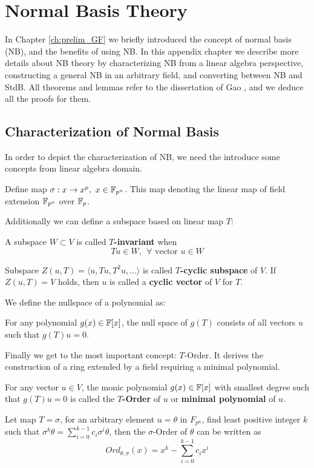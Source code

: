 \chapter{Normal Basis Theory}
\label{append:NB}
In Chapter \ref{ch:prelim_GF} we briefly introduced the concept of normal basis (NB), and 
the benefits of using NB. In this appendix chapter we describe more details about NB theory by 
characterizing NB from a linear algebra perspective, constructing a general NB in an 
arbitrary field, and converting between NB and StdB. All theorems and lemmas refer to the 
dissertation of Gao \cite{gao:phd_normal_basis}, and we deduce all the proofs for them.
\section{Characterization of Normal Basis}
In order to depict the characterization of NB, we need the introduce some concepts from linear algebra domain.
\begin{Definition}
Define map $\sigma:x\to x^p,~x\in {\mathbb{F}}_{p^n}$. This map denoting the linear map of field extension ${\mathbb{F}}_{p^n}$
over ${\mathbb{F}}_p$.
\end{Definition}
Additionally we can define a subspace based on linear map $T$:
\begin{Definition}
A subspace $W\subset V$ is called {\bf $T$-invariant} when 
$$Tu \in W, ~~ \forall \text{ vector }u\in W$$

Subspace $Z(u,T) = \langle u,Tu,T^2u,\dots\rangle$ is called {\bf $T$-cyclic subspace} of $V$.
If $Z(u,T) = V$ holds, then $u$ is called a {\bf cyclic vector} of $V$ for $T$.
\end{Definition}

We define the nullspace of a polynomial as:
\begin{Definition}
\label{def:nullspace}
For any polynomial $g(x) \in {\mathbb{F}}[x]$, the null space of $g(T)$ consists of all vectors $u$ such that
$g(T)u = 0$.
\end{Definition}
Finally we get to the most important concept: $T$-Order. It derives the construction of a ring extended 
by a field requiring a minimal polynomial.
\begin{Definition}
For any vector $u \in V$, the monic polynomial $g(x) \in {\mathbb{F}}[x]$ with smallest degree such that
$g(T)u = 0$ is called the {\bf $T$-Order} of $u$ or {\bf minimal polynomial} of $u$.

Let map $T=\sigma$, for an arbitrary element $u=\theta$ in $F_{p^n}$, find least positive integer $k$ such that
$\sigma^k\theta = \sum_{i=0}^{k-1} c_i\sigma^i\theta$, then the $\sigma$-Order of $\theta$ can be 
written as $$Ord_{\theta,\sigma}(x) = x^k - \sum_{i=0}^{k-1} c_ix^i$$
\end{Definition}

